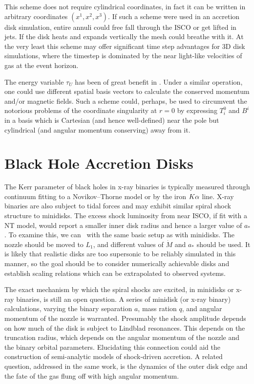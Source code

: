 This scheme does not require cylindrical coordinates, in fact it can be written in arbitrary coordinates $(x^1, x^2, x^3)$.  If such a scheme were used in an accretion disk simulation, entire annuli could free fall through the ISCO or get lifted in jets.  If the disk heats and expands vertically the mesh could breathe with it.  At the very least this scheme may offer significant time step advantages for 3D disk simulations, where the timestep is dominated by the near light-like velocities of gas at the event horizon.

The energy variable $\tau_U$ has been of great benefit in \grdisco.  Under a similar operation, one could use different spatial basis vectors to calculate the conserved momentum and/or magnetic fields.  Such a scheme could, perhaps, be used to circumvent the notorious problems of the coordinate singularity at $r=0$ by expressing $T^0_i$ and $B^i$ in a basis which is Cartesian (and hence well-defined) near the pole but cylindrical (and angular momentum conserving) away from it.

\section*{Black Hole Accretion Disks}

The Kerr parameter of black holes in x-ray binaries is typically measured through continuum fitting to a Novikov--Thorne model or by the iron $K\alpha$ line.  X-ray binaries are also subject to tidal forces and may exhibit similar spiral shock structure to minidisks.  The excess shock luminosity from near ISCO, if fit with a NT model, would report a smaller inner disk radius and hence a larger value of $a_*$.  To examine this, we can \grdisco\ with the same basic setup as with minidisks.  The nozzle should be moved to $L_1$, and different values of $\dot{M}$ and $a_*$ should be used.  It is likely that realistic disks are too supersonic to be reliably simulated in this manner, so the goal should be to consider numerically achievable disks and establish scaling relations which can be extrapolated to observed systems.

The exact mechanism by which the spiral shocks are excited, in minidisks or x-ray binaries, is still an open question.  A series of minidisk (or x-ray binary) calculations, varying the binary separation $a$, mass ration $q$, and angular momentum of the nozzle is warranted.  Presumably the shock amplitude depends on how much of the disk is subject to Lindblad resonances. This depends on the truncation radius, which depends on the angular momentum of the nozzle and the binary orbital parameters.  Elucidating this connection could aid the construction of semi-analytic models of shock-driven accretion.  A related question, addressed in the same work, is the dynamics of the outer disk edge and the fate of the gas flung off with high angular momentum.

